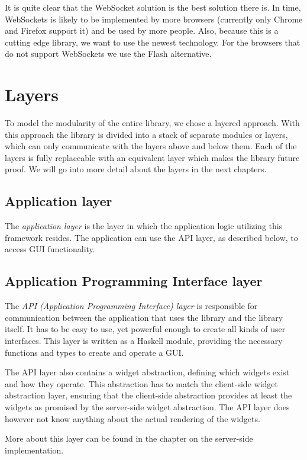 \documentclass[11pt,a4paper]{article}
\begin{document}
It is quite clear that the WebSocket solution is the best solution there is.
In time, WebSockets is likely to be implemented by more browsers (currently only Chrome and Firefox support it) and be used by more people.
Also, because this is a cutting edge library, we want to use the newest technology.
For the browsers that do not support WebSockets we use the Flash alternative.

\newpage
\section{Layers}

To model the modularity of the entire library, we chose a layered approach.
With this approach the library is divided into a stack of separate modules or layers, which can only communicate with the layers above and below them.
Each of the layers is fully replaceable with an equivalent layer which makes the library future proof.
We will go into more detail about the layers in the next chapters.

\subsection{Application layer}
The \textit{application layer} is the layer in which the application logic utilizing this framework resides.
The application can use the API layer, as described below, to access GUI functionality.

\subsection{Application Programming Interface layer}

The \textit{API (Application Programming Interface) layer} is responsible for communication between the application that uses the library and the library itself.
It has to be easy to use, yet powerful enough to create all kinds of user interfaces.
This layer is written as a Haskell module, providing the necessary functions and types to create and operate a GUI.

The API layer also contains a widget abstraction, defining which widgets exist and how they operate.
This abstraction has to match the client-side widget abstraction layer, ensuring that the client-side abstraction provides at least the widgets as promised by the server-side widget abstraction.
The API layer does however not know anything about the actual rendering of the widgets.

More about this layer can be found in the chapter on the server-side implementation.
\end{document}
